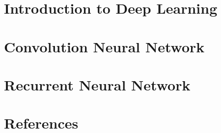 % 

\section[Intro]{Introduction to Deep Learning}
% 
% 
% 
% 

% 
% 
% 

\section[CNN]{Convolution Neural Network}
% 

% 

\section[RNN]{Recurrent Neural Network}
% 
% 
% 

% 
% 

 
 
% 


 \section[Refs]{References}
 

